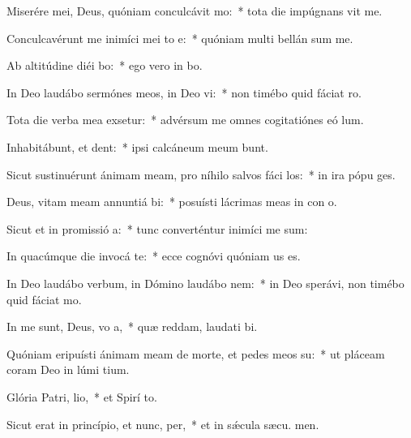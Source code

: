 \item Miserére mei, Deus, quóniam conculcávit  mo:~* tota die impúgnans vit me.
\item Conculcavérunt me inimíci mei to e:~* quóniam multi bellán sum me.
\item Ab altitúdine diéi bo:~* ego vero in  bo.
\item In Deo laudábo sermónes meos, in Deo vi:~* non timébo quid fáciat  ro.
\item Tota die verba mea exsetur:~* advérsum me omnes cogitatiónes eó  lum.
\item Inhabitábunt, et dent:~* ipsi calcáneum meum bunt.
\item Sicut sustinuérunt ánimam meam, pro níhilo salvos fáci los:~* in ira pópu ges.
\item Deus, vitam meam annuntiá bi:~* posuísti lácrimas meas in con o.
\item Sicut et in promissió a:~* tunc converténtur inimíci me sum:
\item In quacúmque die invocá te:~* ecce cognóvi quóniam  us es.
\item In Deo laudábo verbum, in Dómino laudábo nem:~* in Deo sperávi, non timébo quid fáciat  mo.
\item In me sunt, Deus, vo a,~* quæ reddam, laudati bi.
\item Quóniam eripuísti ánimam meam de morte, et pedes meos  su:~* ut pláceam coram Deo in lúmi tium.
\item Glória Patri,  lio,~* et Spirí to.
\item Sicut erat in princípio, et nunc,  per,~* et in sǽcula sæcu. men.
